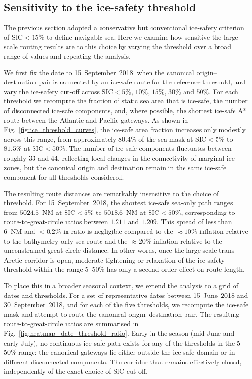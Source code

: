 \subsection{Sensitivity to the ice-safety threshold}
\label{sec:results_ice_threshold}

The previous section adopted a conservative but conventional ice-safety
criterion of $\mathrm{SIC}<15\%$ to define navigable sea. Here we examine how
sensitive the large-scale routing results are to this choice by varying the
threshold over a broad range of values and repeating the analysis.

We first fix the date to 15~September~2018, when the canonical
origin--destination pair is connected by an ice-safe route for the reference
threshold, and vary the ice-safety cut-off across $\mathrm{SIC}<5\%$, $10\%$,
$15\%$, $30\%$ and $50\%$. For each threshold we recompute the fraction of
static sea area that is ice-safe, the number of disconnected ice-safe
components, and, where possible, the shortest ice-safe A* route between the
Atlantic and Pacific gateways. As shown in
Fig.~\ref{fig:ice_threshold_curves}, the ice-safe area fraction increases only
modestly across this range, from approximately $80.4\%$ of the sea mask at
$\mathrm{SIC}<5\%$ to $81.5\%$ at $\mathrm{SIC}<50\%$. The number of
ice-safe components fluctuates between roughly 33 and 44, reflecting local
changes in the connectivity of marginal-ice zones, but the canonical origin
and destination remain in the same ice-safe component for all thresholds
considered.

The resulting route distances are remarkably insensitive to the choice of
threshold. For 15~September~2018, the shortest ice-safe sea-only path ranges
from $5024.5$~NM at $\mathrm{SIC}<5\%$ to $5018.6$~NM at
$\mathrm{SIC}<50\%$, corresponding to route-to-great-circle ratios between
$1.211$ and $1.209$. This spread of less than 6~NM and $<0.2\%$ in ratio is
negligible compared to the $\approx 10\%$ inflation relative to the
bathymetry-only sea route and the $\approx 20\%$ inflation relative to the
unconstrained great-circle distance. In other words, once the large-scale
trans-Arctic corridor is open, moderate tightening or relaxation of the
ice-safety threshold within the range 5--50\% has only a second-order effect on
route length.

To place this in a broader seasonal context, we extend the analysis to a grid
of dates and thresholds. For a set of representative dates between
15~June~2018 and 30~September~2018, and for each of the five thresholds, we
recompute the ice-safe mask and attempt to route the canonical
origin--destination pair. The resulting route-to-great-circle ratios are
summarised in Fig.~\ref{fig:heatmap_date_threshold_ratio}. Early in the
season (mid-June and early July), no continuous ice-safe path exists for any of
the thresholds in the 5--50\% range: the canonical gateways lie either outside
the ice-safe domain or in different disconnected components. The corridor thus
remains effectively closed, independently of the exact choice of
$\mathrm{SIC}$ cut-off.

